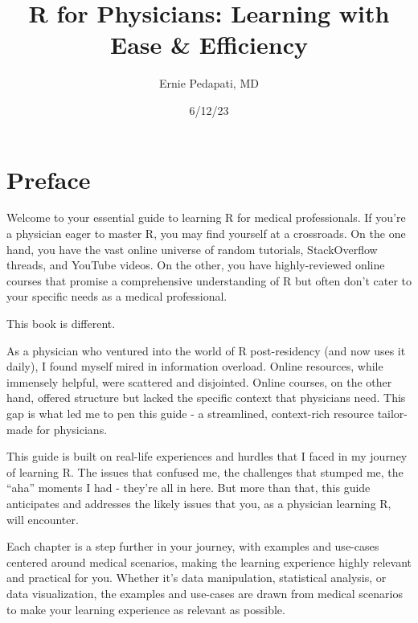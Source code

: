 \documentclass[
  letterpaper,
  DIV=11,
  numbers=noendperiod]{scrreprt}
\title{R for Physicians: Learning with Ease \& Efficiency}
\author{Ernie Pedapati, MD}
\date{6/12/23}
\renewcommand*\contentsname{Table of contents}
\newcommand\contentsname{Table of contents}
\begin{document}
\maketitle
\ifdefined\Shaded\renewenvironment{Shaded}{\begin{tcolorbox}[enhanced, sharp corners, breakable, frame hidden, borderline west={3pt}{0pt}{shadecolor}, boxrule=0pt, interior hidden]}{\end{tcolorbox}}\fi

\renewcommand*\contentsname{Table of contents}
{
\hypersetup{linkcolor=}
\setcounter{tocdepth}{2}
\tableofcontents
}

\hypertarget{preface}{%
\chapter*{Preface}\label{preface}}


Welcome to your essential guide to learning R for medical professionals.
If you're a physician eager to master R, you may find yourself at a
crossroads. On the one hand, you have the vast online universe of random
tutorials, StackOverflow threads, and YouTube videos. On the other, you
have highly-reviewed online courses that promise a comprehensive
understanding of R but often don't cater to your specific needs as a
medical professional.

This book is different.

As a physician who ventured into the world of R post-residency (and now
uses it daily), I found myself mired in information overload. Online
resources, while immensely helpful, were scattered and disjointed.
Online courses, on the other hand, offered structure but lacked the
specific context that physicians need. This gap is what led me to pen
this guide - a streamlined, context-rich resource tailor-made for
physicians.

This guide is built on real-life experiences and hurdles that I faced in
my journey of learning R. The issues that confused me, the challenges
that stumped me, the ``aha'' moments I had - they're all in here. But
more than that, this guide anticipates and addresses the likely issues
that you, as a physician learning R, will encounter.

Each chapter is a step further in your journey, with examples and
use-cases centered around medical scenarios, making the learning
experience highly relevant and practical for you. Whether it's data
manipulation, statistical analysis, or data visualization, the examples
and use-cases are drawn from medical scenarios to make your learning
experience as relevant as possible.
\end{document}
